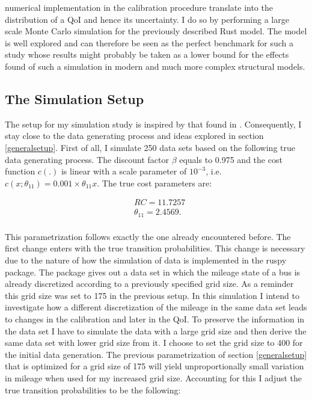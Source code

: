 numerical implementation in the calibration procedure translate into the distribution of a QoI and hence its uncertainty. I do so by performing a large scale Monte Carlo simulation for the previously described Rust model. The model is well explored and can therefore be seen as the perfect benchmark for such a study whose results might probably be taken as a lower bound for the effects found of such a simulation in modern and much more complex structural models.

\subsection{The Simulation Setup}

The setup for my simulation study is inspired by that found in \cite{Iskhakov.2016}. Consequently, I stay close to the data generating process and ideas explored in section \ref{generalsetup}. First of all, I simulate 250 data sets based on the following true data generating process. The discount factor $\beta$ equals to 0.975 and the cost function $c(.)$ is linear with a scale parameter of $10^{-3}$, i.e. $c(x; \theta_{11}) = 0.001 \times \theta_{11} x$. The true cost parameters are:

\begin{equation*}
\begin{split}
& RC = 11.7257 \\
& \theta_{11} = 2.4569 . \\
\end{split}
\end{equation*}

This parametrization follows exactly the one already encountered before. The first change enters with the true transition probabilities. This change is necessary due to the nature of how the simulation of data is implemented in the ruspy package. The package gives out a data set in which the mileage state of a bus is already discretized according to a previously specified grid size. As a reminder this grid size was set to 175 in the previous setup. In this simulation I intend to investigate how a different discretization of the mileage in the same data set leads to changes in the calibration and later in the QoI. To preserve the information in the data set I have to simulate the data with a large grid size and then derive the same data set with lower grid size from it. I choose to set the grid size to 400 for the initial data generation. The previous parametrization of section \ref{generalsetup} that is optimized for a grid size of 175 will yield unproportionally small variation in mileage when used for my increased grid size. Accounting for this I adjust the true transition probabilities to be the following:

